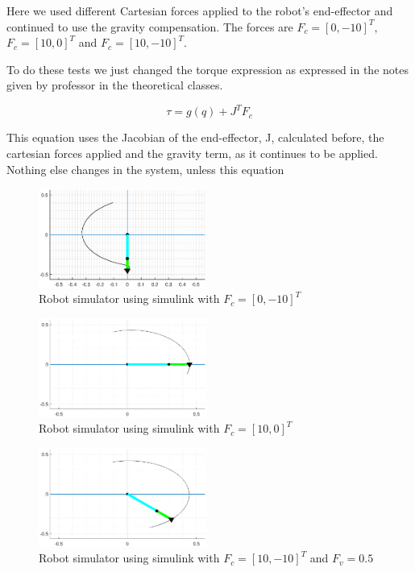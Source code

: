 Here we used different Cartesian forces applied to the robot’s end-effector and continued to use the gravity compensation. The forces are $F_c = [0 ,-10]^T$, $F_c = [10, 0]^T$ and $F_c = [10,-10]^T$.

To do these tests we just changed the torque expression as expressed in the notes given by professor in the theoretical classes.

\begin{equation}
    \tau = g(q) + J^TF_c
\end{equation}

This equation uses the Jacobian of the end-effector, J, calculated before, the cartesian forces applied and the gravity term, as it continues to be applied. Nothing else changes in the system, unless this equation

\begin{figure}[H]
    \centering
    \includegraphics[width=0.49\textwidth]{imgs/6.1.eps}
    \caption{Robot simulator using simulink with $F_c = [0 ,-10]^T$}
    \label{fig:6.1}
\end{figure}

\begin{figure}[H]
    \centering
    \includegraphics[width=0.49\textwidth]{imgs/6.2.eps}
    \caption{Robot simulator using simulink with $F_c = [10, 0]^T$}
    \label{fig:6.2}
\end{figure}

\begin{figure}[H]
    \centering
    \includegraphics[width=0.49\textwidth]{imgs/6.3.eps}
    \caption{Robot simulator using simulink with $F_c = [10,-10]^T$ and $F_v = 0.5$}
    \label{fig:6.3}
\end{figure}

